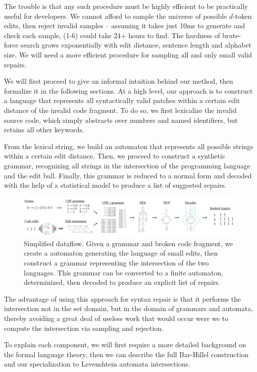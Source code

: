 The trouble is that any such procedure must be highly efficient to be practically useful for developers. We cannot afford to sample the universe of possible $d$-token edits, then reject invalid samples -- assuming it takes just 10ms to generate and check each sample, (1-6) could take 24+ hours to find. The hardness of brute-force search grows exponentially with edit distance, sentence length and alphabet size. We will need a more efficient procedure for sampling all and only small valid repairs.

We will first proceed to give an informal intuition behind our method, then formalize it in the following sections. At a high level, our approach is to construct a language that represents all syntactically valid patches within a certain edit distance of the invalid code fragment. To do so, we first lexicalize the invalid source code, which simply abstracts over numbers and named identifiers, but retains all other keywords.

From the lexical string, we build an automaton that represents all possible strings within a certain edit distance. Then, we proceed to construct a synthetic grammar, recognizing all strings in the intersection of the programming language and the edit ball. Finally, this grammar is reduced to a normal form and decoded with the help of a statistical model to produce a list of suggested repairs.

\begin{figure}[h!]
  \includegraphics[width=\textwidth]{content/figures/flow.pdf}\vspace{-1pt}
  \caption{Simplified dataflow. Given a grammar and broken code fragment, we create a automaton generating the language of small edits, then construct a grammar representing the intersection of the two languages. This grammar can be converted to a finite automaton, determinized, then decoded to produce an explicit list of repairs.}\label{fig:arch_simp}
\end{figure}

The advantage of using this approach for syntax repair is that it performs the intersection not in the set domain, but in the domain of grammars and automata, thereby avoiding a great deal of useless work that would occur were we to compute the intersection via sampling and rejection.

To explain each component, we will first require a more detailed background on the formal language theory, then we can describe the full Bar-Hillel construction and our specialization to Levenshtein automata intersections.

\clearpage